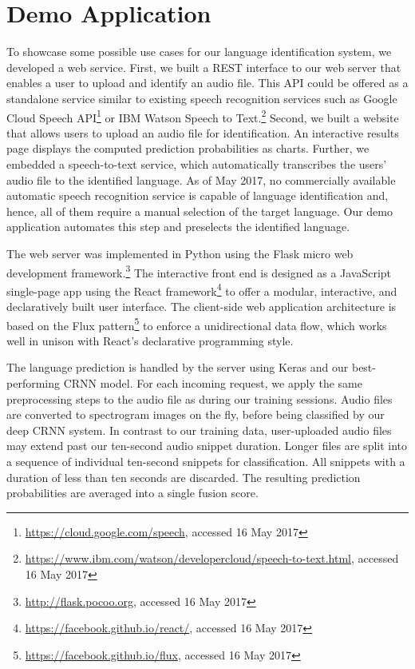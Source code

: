\section{Demo Application}
\label{sec:demo}
To showcase some possible use cases for our language identification system, we developed a web service. First, we built a REST interface to our web server that enables a user to upload and identify an audio file. This API could be offered as a standalone service similar to existing speech recognition services such as Google Cloud Speech API\footnote{\url{https://cloud.google.com/speech}, accessed 16 May 2017} or IBM Watson Speech to Text.\footnote{\url{https://www.ibm.com/watson/developercloud/speech-to-text.html}, accessed 16 May 2017} Second, we built a website that allows users to upload an audio file for identification. An interactive results page displays the computed prediction probabilities as charts. Further, we embedded a speech-to-text service, which automatically transcribes the users' audio file to the identified language. As of May 2017, no commercially available automatic speech recognition service is capable of language identification and, hence, all of them require a manual selection of the target language. Our demo application automates this step and preselects the identified language.

The web server was implemented in Python using the Flask micro web development framework.\footnote{\url{http://flask.pocoo.org}, accessed 16 May 2017} The interactive front end is designed as a JavaScript single-page app using the React framework\footnote{\url{https://facebook.github.io/react/}, accessed 16 May 2017} to offer a modular, interactive, and declaratively built user interface. The client-side web application architecture is based on the Flux pattern\footnote{\url{https://facebook.github.io/flux}, accessed 16 May 2017} to enforce a unidirectional data flow, which works well in unison with React's declarative programming style.

The language prediction is handled by the server using Keras and our best-performing CRNN model. For each incoming request, we apply the same preprocessing steps to the audio file as during our training sessions. Audio files are converted to spectrogram images on the fly, before being classified by our deep CRNN system. In contrast to our training data, user-uploaded audio files may extend past our ten-second audio snippet duration. Longer files are split into a sequence of individual ten-second snippets for classification. All snippets with a duration of less than ten seconds are discarded. The resulting prediction probabilities are averaged into a single fusion score. 






